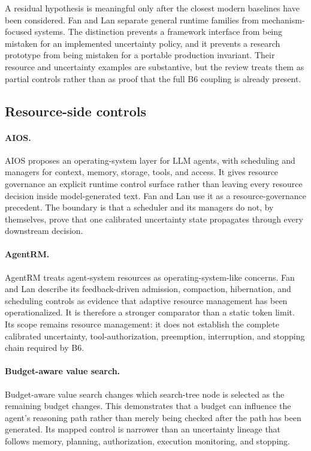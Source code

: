 A residual hypothesis is meaningful only after the closest modern baselines have been considered. Fan and Lan separate general runtime families from mechanism-focused systems. The distinction prevents a framework interface from being mistaken for an implemented uncertainty policy, and it prevents a research prototype from being mistaken for a portable production invariant. Their resource and uncertainty examples are substantive, but the review treats them as partial controls rather than as proof that the full B6 coupling is already present.

\subsection{Resource-side controls}
\label{sec:ch16-resource-baselines}

\paragraph{AIOS.} AIOS proposes an operating-system layer for LLM agents, with scheduling and managers for context, memory, storage, tools, and access. It gives resource governance an explicit runtime control surface rather than leaving every resource decision inside model-generated text. Fan and Lan use it as a resource-governance precedent. The boundary is that a scheduler and its managers do not, by themselves, prove that one calibrated uncertainty state propagates through every downstream decision.\autocite{meiaiOS2024}

\paragraph{AgentRM.} AgentRM treats agent-system resources as operating-system-like concerns. Fan and Lan describe its feedback-driven admission, compaction, hibernation, and scheduling controls as evidence that adaptive resource management has been operationalized. It is therefore a stronger comparator than a static token limit. Its scope remains resource management: it does not establish the complete calibrated uncertainty, tool-authorization, preemption, interruption, and stopping chain required by B6.\autocite{she2026agentrm}

\paragraph{Budget-aware value search.} Budget-aware value search changes which search-tree node is selected as the remaining budget changes. This demonstrates that a budget can influence the agent's reasoning path rather than merely being checked after the path has been generated. Its mapped control is narrower than an uncertainty lineage that follows memory, planning, authorization, execution monitoring, and stopping.\autocite{li2026bavt}

